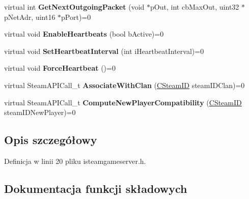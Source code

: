 \begin{DoxyCompactItemize}
\mbox{\label{class_i_steam_game_server_ae35b9006d3335c08b6c91260a7d7b32b}} 
virtual int {\bfseries Get\+Next\+Outgoing\+Packet} (void $\ast$p\+Out, int cb\+Max\+Out, uint32 $\ast$p\+Net\+Adr, uint16 $\ast$p\+Port)=0
\item 
\mbox{\label{class_i_steam_game_server_a554a7137d015c339d6c8bbce68326c33}} 
virtual void {\bfseries Enable\+Heartbeats} (bool b\+Active)=0
\item 
\mbox{\label{class_i_steam_game_server_ac74469cb161689c9d4757c8531ff3040}} 
virtual void {\bfseries Set\+Heartbeat\+Interval} (int i\+Heartbeat\+Interval)=0
\item 
\mbox{\label{class_i_steam_game_server_af6715533b65ca48e9aaacd2ac3ce15e5}} 
virtual void {\bfseries Force\+Heartbeat} ()=0
\item 
\mbox{\label{class_i_steam_game_server_a9d11b87c9e5b8c900cbd632bc68dd56c}} 
virtual Steam\+A\+P\+I\+Call\+\_\+t {\bfseries Associate\+With\+Clan} (\hyperlink{class_c_steam_i_d}{C\+Steam\+ID} steam\+I\+D\+Clan)=0
\item 
\mbox{\label{class_i_steam_game_server_a0d725302602b9ad01cfa87599986a037}} 
virtual Steam\+A\+P\+I\+Call\+\_\+t {\bfseries Compute\+New\+Player\+Compatibility} (\hyperlink{class_c_steam_i_d}{C\+Steam\+ID} steam\+I\+D\+New\+Player)=0
\end{DoxyCompactItemize}


\subsection{Opis szczegółowy}


Definicja w linii 20 pliku isteamgameserver.\+h.



\subsection{Dokumentacja funkcji składowych}
\mbox{\label{class_i_steam_game_server_aeb0b8c4368d82afaef1f00de926108ff}} 
